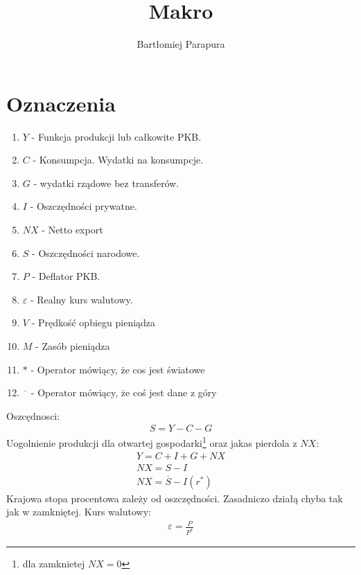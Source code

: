 \documentclass{article}
\title{Makro}
\author{Bartłomiej Parapura}
\begin{document}
\maketitle
\section{Oznaczenia}
\begin{enumerate}
    \item \(Y\) - Funkcja produkcji lub całkowite PKB.
    \item \(C\) - Konsumpcja. Wydatki na konsumpcje.
    \item \(G\) - wydatki rządowe bez transferów.
    \item \(I\) - Oszczędności prywatne.
    \item \(NX\) - Netto export
    \item \(S\) - Oszczędności narodowe.
    \item \(P\) - Deflator PKB.
    \item \(\varepsilon\) - Realny kurs walutowy.
    \item \(V\) - Prędkość opbiegu pieniądza
    \item \(M\) - Zasób pieniądza
    \item \(*\) - Operator mówiący, że cos jest światowe
    \item \(\overline{\phantom{a}}\) - Operator mówiący, że coś jest dane z góry
\end{enumerate}
Oszcędnosci:
\begin{gather}
    S = Y - C - G
\end{gather}
Uogolnienie produkcji dla otwartej gospodarki\footnote{dla zamknietej \(NX = 0\)} oraz jakas pierdola z \(NX\):
\begin{gather}
    Y = C + I + G + NX\\
    NX = S - I\\
    NX = \overline{S} - I(r^*)
\end{gather}
Krajowa stopa procentowa zależy od oszczędności. Zasadniczo działą chyba tak jak w zamkniętej.
Kurs walutowy:
\begin{gather}
    \varepsilon = \frac{P}{P^*}
\end{gather}
\end{document}

